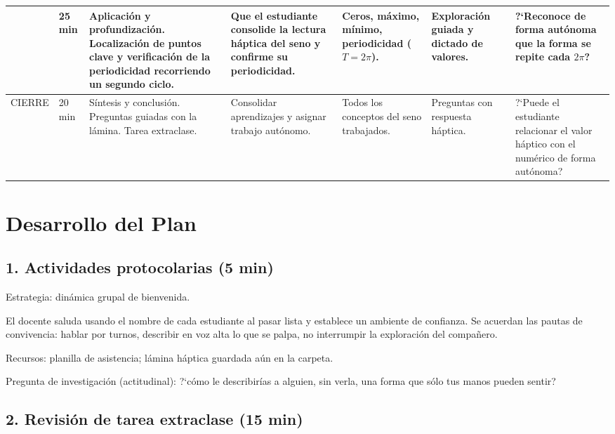 \documentclass[14pt, a4paper]{extarticle}
\begin{document}
{\begin{tabular}{|M{1.2cm}|M{0.95cm}|L{2.6cm}|L{2.2cm}|L{2.1cm}|L{1.9cm}|L{2.5cm}|}
& 25 min
& Aplicaci\'on y profundizaci\'on. Localizaci\'on de puntos clave y verificaci\'on de la periodicidad recorriendo un segundo ciclo.
& Que el estudiante consolide la lectura h\'aptica del seno y confirme su periodicidad.
& Ceros, m\'aximo, m\'inimo, periodicidad ($T=2\pi$).
& Exploraci\'on guiada y dictado de valores.
& ?`Reconoce de forma aut\'onoma que la forma se repite cada $2\pi$? \\
\hline

CIERRE
& 20 min
& S\'intesis y conclusi\'on. Preguntas guiadas con la l\'amina. Tarea extraclase.
& Consolidar aprendizajes y asignar trabajo aut\'onomo.
& Todos los conceptos del seno trabajados.
& Preguntas con respuesta h\'aptica.
& ?`Puede el estudiante relacionar el valor h\'aptico con el num\'erico de forma aut\'onoma? \\
\hline

\end{tabular}
}

\section{Desarrollo del Plan}

\subsection{1. Actividades protocolarias \normalfont(5 min)}

Estrategia: din\'amica grupal de bienvenida.

El docente saluda usando el nombre de cada estudiante al pasar lista y establece
un ambiente de confianza. Se acuerdan las pautas de convivencia: hablar por
turnos, describir en voz alta lo que se palpa, no interrumpir la exploraci\'on
del compa\~nero.

Recursos: planilla de asistencia; l\'amina h\'aptica guardada a\'un en la
carpeta.

Pregunta de investigaci\'on (actitudinal): ?`c\'omo le describir\'ias a alguien,
sin verla, una forma que s\'olo tus manos pueden sentir?

\subsection{2. Revisi\'on de tarea extraclase \normalfont(15 min)}
\end{document}
